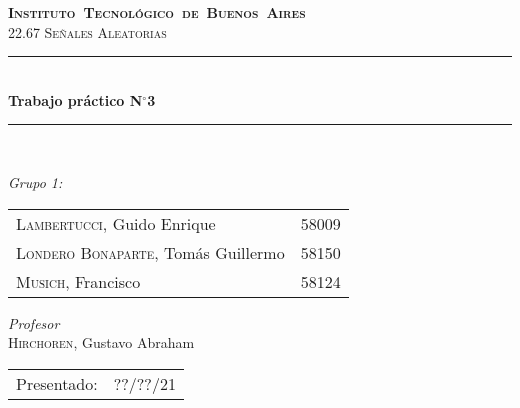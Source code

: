 \begin{titlepage}
\newcommand{\HRule}{\rule{\linewidth}{0.5mm}}
\center
\mbox{\textsc{\LARGE \bfseries {Instituto Tecnológico de Buenos Aires}}}\\[1.5cm]
\textsc{\Large 22.67 Señales Aleatorias}\\[0.5cm]


\HRule \\[0.6cm]
{ \Huge \bfseries Trabajo práctico N$^{\circ}$3}\\[0.4cm] 
\HRule \\[1.5cm]


{\large

\emph{Grupo 1:}\\
\vspace{3px}

\begin{tabular}{lr} 	
\textsc{Lambertucci}, Guido Enrique  & 58009 \\
\textsc{Londero Bonaparte}, Tomás Guillermo  & 58150 \\
\textsc{Musich}, Francisco  & 58124\\
\end{tabular}

\vspace{20px}

\emph{Profesor}\\
\textsc{Hirchoren}, Gustavo Abraham \\
\vspace{3px}

\vspace{100px}

\begin{tabular}{ll}

Presentado: & ??/??/21\\

\end{tabular}

}

\vfill

\end{titlepage}
